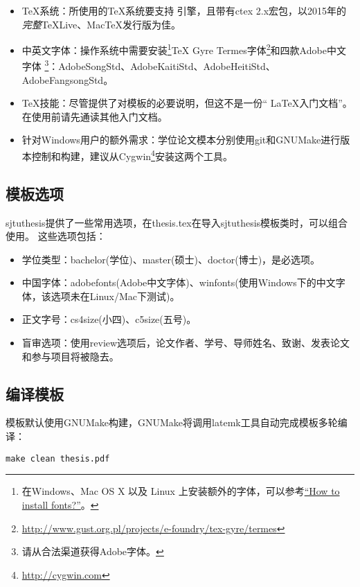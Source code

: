 \begin{itemize}[noitemsep,topsep=0pt,parsep=0pt,partopsep=0pt]
	\item {\TeX}系统：所使用的{\TeX}系统要支持 \XeTeX 引擎，且带有ctex 2.x宏包，以2015年的\emph{完整}TeXLive、MacTeX发行版为佳。
	\item 中英文字体：操作系统中需要安装\footnote{在Windows、Mac OS X 以及 Linux 上安装额外的字体，可以参考\href{https://www.searchfreefonts.com/articles/how-to-install-fonts.htm}{“How to install fonts?”}。
}TeX Gyre Termes字体\footnote{\url{http://www.gust.org.pl/projects/e-foundry/tex-gyre/termes}}和四款Adobe中文字体
\footnote{请从合法渠道获得Adobe字体。}：AdobeSongStd、AdobeKaitiStd、AdobeHeitiStd、AdobeFangsongStd。
	\item TeX技能：尽管提供了对模板的必要说明，但这不是一份“ \LaTeX 入门文档”。在使用前请先通读其他入门文档。
	\item 针对Windows用户的额外需求：学位论文模本分别使用git和GNUMake进行版本控制和构建，建议从Cygwin\footnote{\url{http://cygwin.com}}安装这两个工具。
\end{itemize}

\subsection{模板选项}
\label{sec:thesisoption}

sjtuthesis提供了一些常用选项，在thesis.tex在导入sjtuthesis模板类时，可以组合使用。
这些选项包括：

\begin{itemize}[noitemsep,topsep=0pt,parsep=0pt,partopsep=0pt]
\item 学位类型：bachelor(学位)、master(硕士)、doctor(博士)，是必选项。
\item 中国字体：adobefonts(Adobe中文字体)、winfonts(使用Windows下的中文字体，该选项未在Linux/Mac下测试)。
\item 正文字号：cs4size(小四)、c5size(五号)。
\item 盲审选项：使用review选项后，论文作者、学号、导师姓名、致谢、发表论文和参与项目将被隐去。
\end{itemize}

\subsection{编译模板}
\label{sec:process}

模板默认使用GNUMake构建，GNUMake将调用latemk工具自动完成模板多轮编译：

\begin{lstlisting}[basicstyle=\small\ttfamily, caption={编译模板}, numbers=none]
make clean thesis.pdf
\end{lstlisting}

